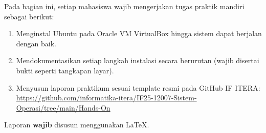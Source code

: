 Pada bagian ini, setiap mahasiswa wajib mengerjakan tugas praktik mandiri sebagai berikut:
\begin{enumerate}
	\item Menginstal Ubuntu pada Oracle VM VirtualBox hingga sistem dapat berjalan dengan baik.
	\item Mendokumentasikan setiap langkah instalasi secara berurutan (wajib disertai bukti seperti tangkapan layar).
	\item Menyusun laporan praktikum sesuai template resmi pada GitHub IF ITERA:
	      \url{https://github.com/informatika-itera/IF25-12007-Sistem-Operasi/tree/main/Hands-On}
\end{enumerate}

Laporan \textbf{wajib} disusun menggunakan \LaTeX.
